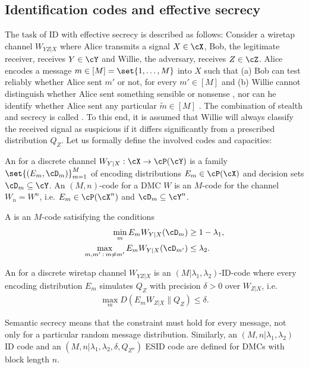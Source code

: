 \documentclass[conference,final]{IEEEtran}
\begin{document}
\subsection{Identification codes and effective secrecy}

The task of ID with effective secrecy is described as follows:
Consider a wiretap channel $W_{YZ|X}$ where Alice transmits
a signal $X \in \cX$, Bob, the legitimate receiver, receives $Y \in \cY$
and Willie, the adversary, receives $Z \in \cZ$.
Alice encodes a message $m \in [M] = \set{1,\dots,M}$ into $X$ such that
(a) Bob can test reliably whether Alice sent $m'$ or not, for every $m' \in [M]$
and (b) Willie cannot distinguish whether Alice sent something
sensible or nonsense , nor
can he identify whether Alice sent any particular $\tilde{m} \in [M]$ .
The combination of stealth and secrecy is called .
To this end, it is assumed that Willie will always classify the received signal
as suspicious if it differs significantly from a prescribed distribution $Q_Z$.
Let us formally define the involved codes and capacities:

An  for a discrete channel $W_{Y|X} : \cX \to \cP(\cY)$
is a family $\set{ (E_m, \cD_m) }_{m=1}^M$
of encoding distributions $E_m \in \cP(\cX)$
and decision sets $\cD_m \subseteq \cY$.
An $(M, n)$-code for a DMC $W$ is an
$M$-code for the channel $W_n = W^n$,
i.e. $E_m \in \cP(\cX^n)$ and $\cD_m \subseteq \cY^n$.

A  is
an $M$-code satisifying the conditions
\begin{align}
  \min_m E_m W_{Y|X} (\cD_m)
    &\ge 1 - \lambda_1,
    \\
  \max_{m, m' \::\: m \neq m'} E_m W_{Y|X} (\cD_{m'})
    &\le \lambda_2.
\end{align}

An
for a discrete wiretap channel $W_{YZ|X}$
is an $(M | \lambda_1, \lambda_2)$-ID-code
where every encoding distribution $E_m$ simulates $Q_Z$ with precision $\delta > 0$ over
$W_{Z|X}$, i.e.
\begin{gather}
  \max_m D(E_m W_{Z|X} \| Q_Z)
    \le \delta.
\end{gather}

Semantic secrecy means that the constraint must hold for every message,
not only for a particular random message distribution.
Similarly, an $(M, n | \lambda_1, \lambda_2)$ ID code
and an $(M, n | \lambda_1, \lambda_2, \delta, Q_{Z^n})$ ESID code
are defined for DMCs with block length $n$.
\end{document}
